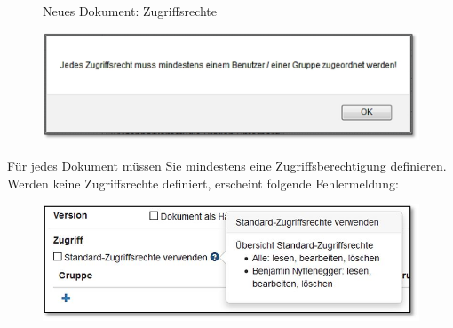 \begin{figure}[H]
\caption{Neues Dokument: Zugriffsrechte}
\end{figure}

\begin{figure}   %
  \vspace{-30pt}      %
  \begin{center}
    \includegraphics[width=1\linewidth]{../chapters/11_Dokumentenablage/pictures/11-berecht_Fehlermeldung.jpg}
  \end{center}
  \vspace{-20pt}
  \vspace{-10pt}
\end{figure}

Für jedes Dokument müssen Sie mindestens eine Zugriffsberechtigung definieren. Werden keine Zugriffsrechte definiert, erscheint folgende Fehlermeldung:

\vspace{.5cm}

\begin{figure}   %
  \vspace{-30pt}      %
  \begin{center}
    \includegraphics[width=1\linewidth]{../chapters/11_Dokumentenablage/pictures/dok_Standardrechte_Info.jpg}
  \end{center}
  \vspace{-20pt}
  \vspace{-10pt}
\end{figure}

